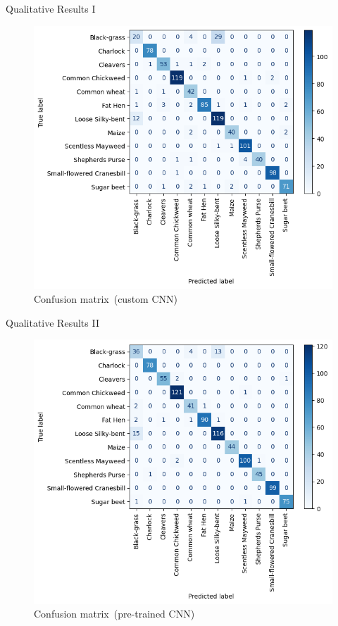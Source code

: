 \documentclass{beamer}
\begin{document}
\begin{frame}{Qualitative Results I}
    \begin{figure}
        \includegraphics[width=0.6\linewidth]{../resources/custom_cnn/confusion.png}
        \caption{Confusion matrix~(custom CNN)}\label{fig:confusion-matrix-custom-cnn}
    \end{figure}
\end{frame}

\begin{frame}{Qualitative Results II}
    \begin{figure}
        \includegraphics[width=0.6\linewidth]{../resources/resnet/confusion.png}
        \caption{Confusion matrix~(pre-trained CNN)}\label{fig:confusion-matrix-pretrained-cnn}
    \end{figure}
\end{frame}
\end{document}
